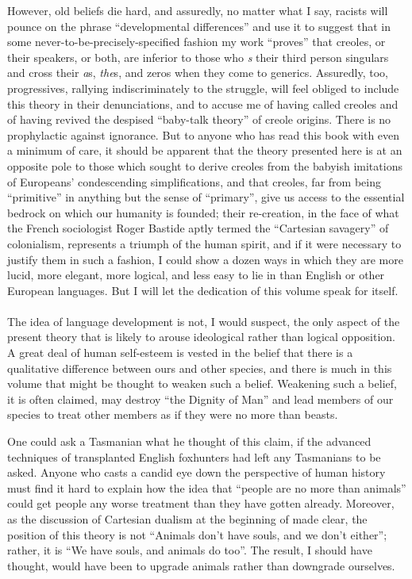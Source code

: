 However, old beliefs die hard, and assuredly, no matter what I say, racists will pounce on the phrase ``developmental differences'' and use it to suggest that in some never-to-be-precisely-specified fashion my work ``proves'' that creoles, or their speakers, or both, are inferior to those who \textit{s} their third person singulars and cross their \textit{a}s, \textit{the}s, and zeros when they come to generics. Assuredly, too, progressives, rallying indiscriminately to the struggle, will feel obliged to include this theory in their denunciations, and to accuse me of having called creoles  and of having revived the despised ``baby-talk theory'' of creole origins. There is no prophylactic against ignorance. But to anyone who has read this book with even a minimum of care, it should be apparent that the theory presented here is at an opposite pole to those which sought to derive creoles from the babyish imitations of Europeans' condescending simplifications, and that creoles, far from being ``primitive'' in anything but the sense of ``primary'', give us access to the essential bedrock on which our humanity is founded; their re-creation, in the face of what the French sociologist Roger Bastide aptly termed the ``Cartesian savagery'' of colonialism, represents a triumph of the human spirit, and if it were necessary to justify them in such a fashion, I could show a dozen ways in which they are more lucid, more elegant, more logical, and less easy to lie in than English or other European languages. But I will let the dedication of this volume speak for itself.\\\\

The idea of language development is not, I would suspect, the only aspect of the present theory that is likely to arouse ideological rather than logical opposition. A great deal of human self-esteem is vested in the belief that there is a qualitative difference between ours and other species, and there is much in this volume that might be thought to weaken such a belief. Weakening such a belief, it is often claimed, may destroy ``the Dignity of Man'' and lead members of our species to treat other members as if they were no more than beasts.

One could ask a Tasmanian what he thought of this claim, if the advanced techniques of transplanted English foxhunters had
left any Tasmanians to be asked. Anyone who casts a candid eye down the perspective of human history must find it hard to explain how the idea that ``people are no more than animals'' could get people any worse treatment than they have gotten already. Moreover, as the discussion of Cartesian dualism at the beginning of  made clear, the position of this theory is not ``Animals don't have souls, and we don't either''; rather, it is ``We have souls, and animals do too''. The result, I should have thought, would have been to upgrade animals rather than downgrade ourselves.

